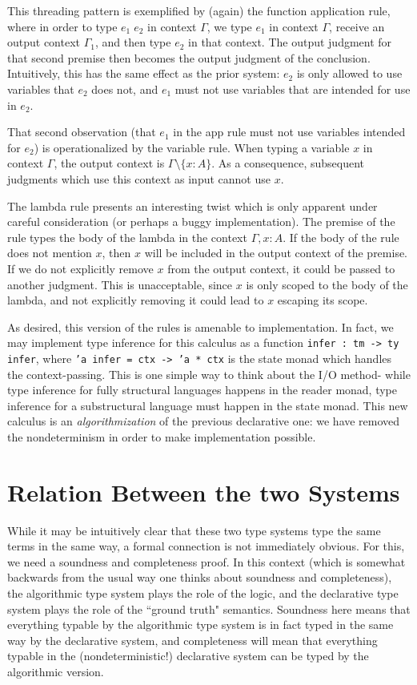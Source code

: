 \documentclass{article}
\theoremstyle{definition}
\begin{document}
This threading pattern is exemplified by (again) the function application rule, where in order to type $e_1 \; e_2$ in context $\Gamma$, we type $e_1$ in context $\Gamma$, receive an output context $\Gamma_1$, and then type $e_2$ in that context. The output judgment for that second premise then becomes the output judgment of the conclusion. Intuitively, this has the same effect as the prior system: $e_2$ is only allowed to use variables that $e_2$ does not, and $e_1$ must not use variables that are intended for use in $e_2$.

That second observation (that $e_1$ in the app rule must not use variables intended for $e_2$) is operationalized by the variable rule. When typing a variable $x$ in context $\Gamma$, the output context is $\Gamma \setminus \{x : A\}$. As a consequence, subsequent judgments which use this context as input cannot use $x$.

The lambda rule presents an interesting twist which is only apparent under careful consideration (or perhaps a buggy implementation). The premise of the rule types the body of the lambda in the context $\Gamma,x : A$. If the body of the rule does not mention $x$, then $x$ will be included in the output context of the premise. If we do not explicitly remove $x$ from the output context, it could be passed to another judgment. This is unacceptable, since $x$ is only scoped to the body of the lambda, and not explicitly removing it could lead to $x$ escaping its scope.

As desired, this version of the rules is amenable to implementation. In fact, we may implement type inference for this calculus as a function \texttt{infer : tm -> ty infer}, where \texttt{'a infer = ctx -> 'a * ctx} is the state monad which handles the context-passing. This is one simple way to think about the I/O method- while type inference for fully structural languages happens in the reader monad, type inference for a substructural language must happen in the state monad. This new calculus is an \textit{algorithmization} of the previous declarative one: we have removed the nondeterminism in order to make implementation possible.

\section{Relation Between the two Systems}
While it may be intuitively clear that these two type systems type the same terms in the same way, a formal connection is not immediately obvious. For this, we need a soundness and completeness proof. In this context (which is somewhat backwards from the usual way one thinks about soundness and completeness), the algorithmic type system plays the role of the logic, and the declarative type system plays the role of the ``ground truth" semantics. Soundness here means that everything typable by the algorithmic type system is in fact typed in the same way by the declarative system, and completeness will mean that everything typable in the (nondeterministic!) declarative system can be typed by the algorithmic version.
\end{document}
